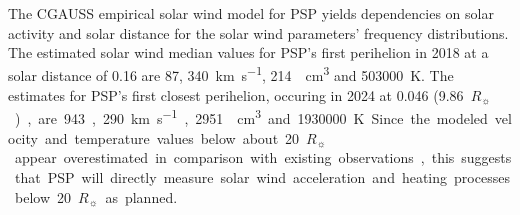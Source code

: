 \documentclass[]{aa}
\newcommand{\Rs}{$R_\sun{}$}
\begin{document}
	{The CGAUSS empirical solar wind model for PSP yields dependencies on solar activity and solar distance for the solar wind parameters' frequency distributions. The estimated solar wind median values for PSP’s first perihelion in 2018 at a solar distance of \SI{0.16}{\au} are \SI{87}{\nT}, \SI{340}{\km\per\s}, \SI{214}{\per\cm\cubed} and \SI{503000}{\K}. The estimates for PSP’s first closest perihelion, occuring in 2024 at \SI{0.046}{\au} (\SI{9.86}{\Rs}), are \SI{943}{\nT}, \SI{290}{\km\per\s}, \SI{2951}{\per\cm\cubed} and \SI{1930000}{\K}. Since the modeled velocity and temperature values below about \SI{20}{\Rs} appear overestimated in comparison with existing observations, this suggests that PSP will directly measure solar wind acceleration and heating processes below \SI{20}{\Rs} as planned.}
	{}

	\maketitle
\end{document}
